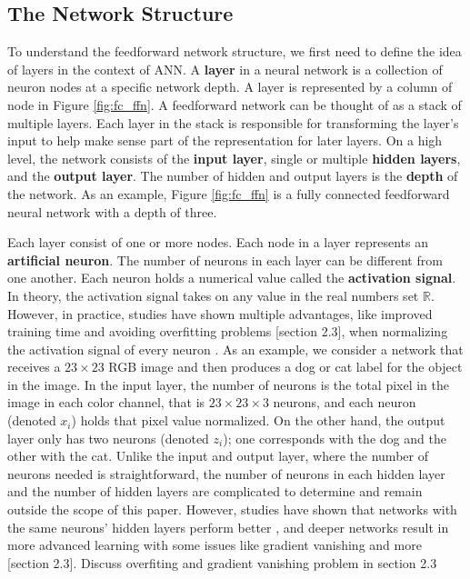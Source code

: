 \subsection{The Network Structure \label{network_structure}}
To understand the feedforward network structure, we first need to define the idea of layers in the context of ANN. A \textbf{layer} in a neural network is a collection of neuron nodes at a specific network depth. A layer is represented by a column of node in Figure \ref{fig:fc_ffn}. A feedforward network can be thought of as a stack of multiple layers. Each layer in the stack is responsible for transforming the layer's input to help make sense part of the representation for later layers. On a high level, the network consists of the \textbf{input layer}, single or multiple \textbf{hidden layers}, and the \textbf{output layer}. The number of hidden and output layers is the \textbf{depth} of the network. As an example, Figure \ref{fig:fc_ffn} is a fully connected feedforward neural network with a depth of three.

Each layer consist of one or more nodes. Each node in a layer represents an \textbf{artificial neuron}. The number of neurons in each layer can be different from one another. Each neuron holds a numerical value called the \textbf{activation signal}. In theory, the activation signal takes on any value in the real numbers set $\mathbb{R}$. However, in practice, studies have shown multiple advantages, {\color{red} like improved training time and avoiding overfitting problems [section 2.3]}, when normalizing the activation signal of every neuron \cite{lecun2012efficient}. As an example, we consider a network that receives a $23 \times 23$ RGB image and then produces a dog or cat label for the object in the image. In the input layer, the number of neurons is the total pixel in the image in each color channel, that is $23 \times 23 \times 3$ neurons, and each neuron (denoted $x_i$) holds that pixel value normalized. On the other hand, the output layer only has two neurons (denoted $z_i$); one corresponds with the dog and the other with the cat. Unlike the input and output layer, where the number of neurons needed is straightforward, the number of neurons in each hidden layer and the number of hidden layers are complicated to determine and remain outside the scope of this paper. However, studies have shown that networks with the same neurons' hidden layers perform better \cite{taylor2017neural}, and deeper networks result in more advanced learning with some issues like gradient vanishing and more {\color{red} [section 2.3]}. {\color{red} Discuss overfiting and gradient vanishing problem in section 2.3}

